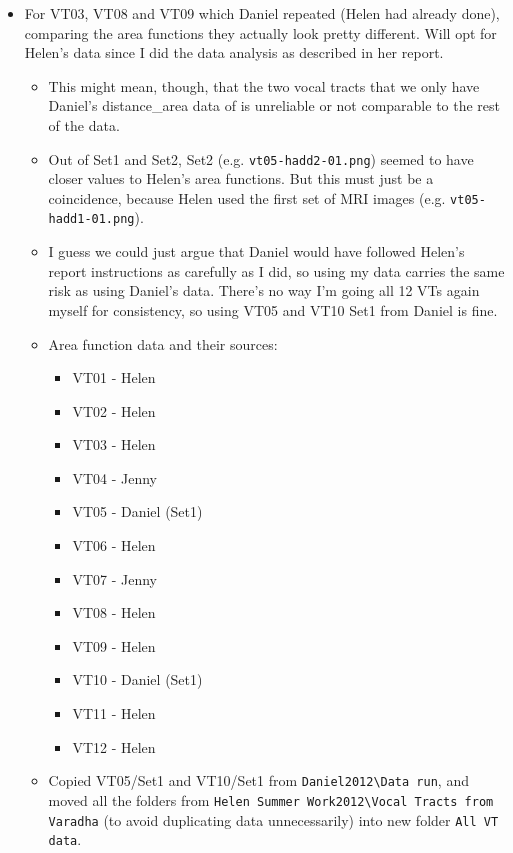 \documentclass{article}
\begin{document}
\begin{itemize}
    \item For VT03, VT08 and VT09 which Daniel repeated (Helen had already done), comparing the area functions they actually look pretty different. Will opt for Helen's data since I did the data analysis as described in her report. 
    \begin{itemize}
        \item This might mean, though, that the two vocal tracts that we only have Daniel's distance\_area data of is unreliable or not comparable to the rest of the data.
        \item Out of Set1 and Set2, Set2 (e.g. \verb|vt05-hadd2-01.png|) seemed to have closer values to Helen's area functions. But this must just be a coincidence, because Helen used the first set of MRI images (e.g. \verb|vt05-hadd1-01.png|).
        \item I guess we could just argue that Daniel would have followed Helen's report instructions as carefully as I did, so using my data carries the same risk as using Daniel's data. There's no way I'm going all 12 VTs again myself for consistency, so using VT05 and VT10 Set1 from Daniel is fine.
        \item Area function data and their sources:
        \begin{itemize}
            \item VT01 - Helen
            \item VT02 - Helen
            \item VT03 - Helen
            \item VT04 - Jenny
            \item VT05 - Daniel (Set1)
            \item VT06 - Helen
            \item VT07 - Jenny
            \item VT08 - Helen
            \item VT09 - Helen
            \item VT10 - Daniel (Set1)
            \item VT11 - Helen
            \item VT12 - Helen
        \end{itemize}
        \item Copied VT05/Set1 and VT10/Set1 from \verb|Daniel2012\Data run|, and moved all the folders from \verb|Helen Summer Work2012\Vocal Tracts from Varadha| (to avoid duplicating data unnecessarily) into new folder \verb|All VT data|.
    \end{itemize}

\end{itemize}
\end{document}
